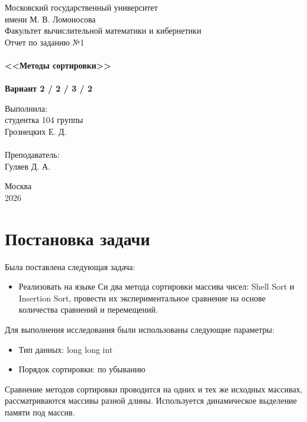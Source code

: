 \documentclass[a4paper,12pt,titlepage,finall]{article}
\begin{document}
\begin{titlepage}
    \begin{center}
	{\small \sc Московский государственный университет \\имени М. В. Ломоносова\\
	Факультет вычислительной математики и кибернетики\\}
	\vfill
	{\Large \sc Отчет по заданию №1}\\
	~\\
	{\large \bf <<Методы сортировки>>}\\ 
	~\\
	{\large \bf Вариант 2 / 2 / 3 / 2}
    \end{center}
    \begin{flushright}
	\vfill {Выполнила:\\
	студентка 104 группы\\
	Грознецких Е. Д.\\
	~\\
	Преподаватель:\\
	Гуляев Д. А.}
    \end{flushright}
    \begin{center}
	\vfill
	{\small Москва\\2026}
    \end{center}
\end{titlepage}

\tableofcontents
\newpage

\section{Постановка задачи}

Была поставлена следующая задача:
\begin{itemize}
\item Реализовать на языке Си два метода сортировки массива чисел: Shell Sort и Insertion Sort, провести их экспериментальное сравнение на основе количества сравнений и перемещений.
\end{itemize}

Для выполнения исследования были использованы следующие параметры:
\begin{itemize}
\item Тип данных: long long int
\item Порядок сортировки: по убыванию
\end{itemize}

Сравнение методов сортировки проводится на одних и тех же исходных массивах, рассматриваются массивы разной длины. Используется динамическое выделение памяти под массив. \\
\end{document}
